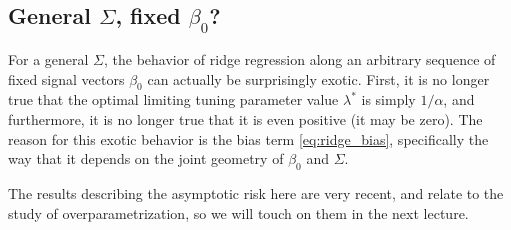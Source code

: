\documentclass{article}
\begin{document}
\subsection{General $\Sigma$, fixed $\beta_0$?}

For a general $\Sigma$, the behavior of ridge regression along an arbitrary
sequence of fixed signal vectors $\beta_0$ can actually be surprisingly
exotic. First, it is no longer true that the optimal limiting tuning parameter
value $\lambda^*$ is simply $1/\alpha$, and furthermore, it is no longer true
that it is even positive (it may be zero). The reason for this exotic behavior
is the bias term \eqref{eq:ridge_bias}, specifically the way that it depends on
the joint geometry of $\beta_0$ and $\Sigma$.

The results describing the asymptotic risk here are very recent, and relate to
the study of overparametrization, so we will touch on them in the next lecture. 



\end{document}
